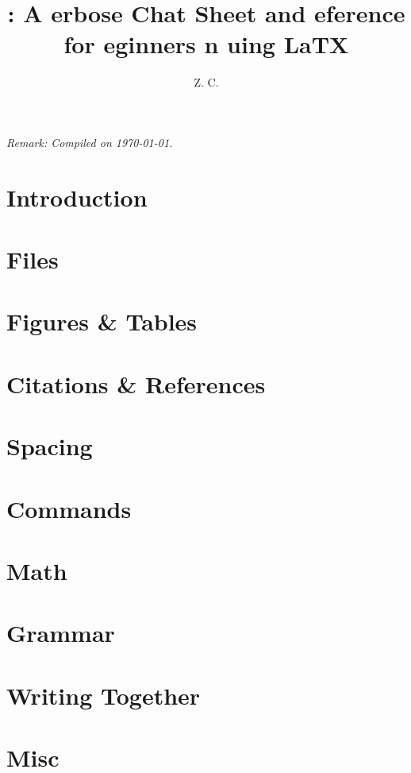 \documentclass[letterpaper]{article} %
\title{\ug{0}{VERBOSE}: A \ug{1}{V}erbose Ch\ug{0.8}{e}at Sheet and \ug{0.6}{R}eference for \ug{0.4}{B}eginners \ug{0.6}{o}n u\ug{0.8}{s}ing LaT\ug{1}{e}X}
\author{Z. C.}
\begin{document}
\maketitle

\begin{abstract}
  
\end{abstract}

\textit{Remark: Compiled on \today.}

\setcounter{tocdepth}{3}
\tableofcontents
\newpage


\section{Introduction}



\section{Files}



\section{Figures \& Tables}




\section{Citations \& References}
\label{sec:citeref}




\section{Spacing}
\label{sec:spacing}



\section{Commands}



\section{Math}



\section{Grammar}



\section{Writing Together}



\section{Misc}



\clearpage

\end{document}
